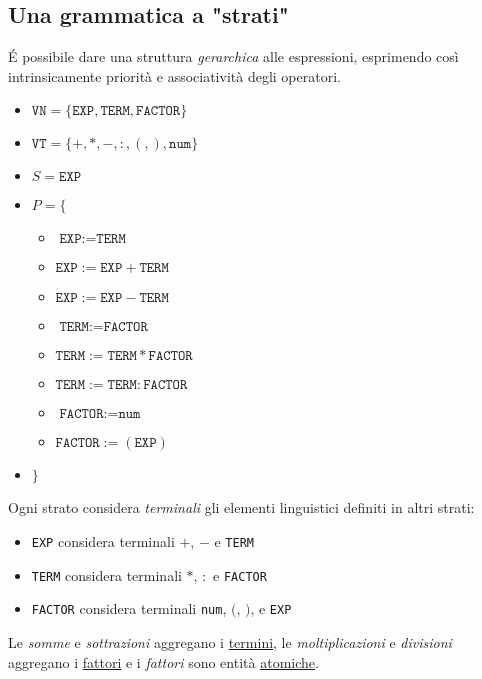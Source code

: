 \subsection{Una grammatica a "strati"}
É possibile dare una struttura \textit{gerarchica} alle espressioni, esprimendo così intrinsicamente priorità e associatività degli operatori.
\begin{itemize}[label={}]
    \item $\texttt{VN} = \{ \texttt{EXP}, \texttt{TERM}, \texttt{FACTOR}\}$
    \item $\texttt{VT} = \{+, *, -, :, (, ), \texttt{num}\}$
    \item $S = \texttt{EXP}$
    \item $P = \{$
    \begin{itemize}[label={}]
        \item $\texttt{EXP} := \texttt{TERM}$
        \item $\texttt{EXP} := \texttt{EXP} + \texttt{TERM}$
        \item $\texttt{EXP} := \texttt{EXP} - \texttt{TERM}$
        \item $\texttt{TERM} := \texttt{FACTOR}$
        \item $\texttt{TERM} := \texttt{TERM} * \texttt{FACTOR}$
        \item $\texttt{TERM} := \texttt{TERM} : \texttt{FACTOR}$
        \item $\texttt{FACTOR} := \texttt{num}$
        \item $\texttt{FACTOR} := ( \texttt{EXP})$
    \end{itemize}
    \item $\}$
\end{itemize}
\setlist{}
Ogni strato considera \textit{terminali} gli elementi linguistici definiti in altri strati:
\begin{itemize}
    \item \texttt{EXP} considera terminali $+$, $-$ e \texttt{TERM}
    \item \texttt{TERM} considera terminali $*$, $:$ e \texttt{FACTOR}
    \item \texttt{FACTOR} considera terminali \texttt{num}, $($, $)$, e \texttt{EXP}
\end{itemize}

Le \textit{somme} e \textit{sottrazioni} aggregano i \underline{termini}, le \textit{moltiplicazioni} e \textit{divisioni} aggregano i \underline{fattori} e i \textit{fattori} sono entità \underline{atomiche}.

